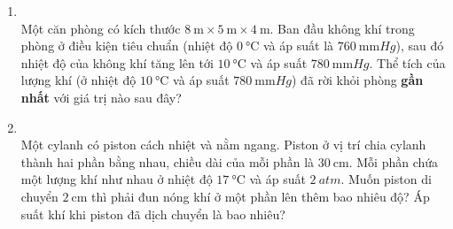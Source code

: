 \begin{enumerate}[label=\bfseries Câu \arabic*:, leftmargin=1.7cm]
\item {}\\
Một căn phòng có kích thước $\SI{8}{\meter}\times \SI{5}{\meter}\times\SI{4}{\meter}$. Ban đầu không khí trong phòng ở điều kiện tiêu chuẩn (nhiệt độ $\SI{0}{\celsius}$ và áp suất là $\SI{760}{\milli\meter Hg}$), sau đó nhiệt độ của không khí tăng lên tới $\SI{10}{\celsius}$ và áp suất $\SI{780}{\milli\meter Hg}$. Thể tích của lượng khí (ở nhiệt độ $\SI{10}{\celsius}$ và áp suất $\SI{780}{\milli\meter Hg}$) đã rời khỏi phòng \textbf{gần nhất} với giá trị nào sau đây?
\item {}\\
Một cylanh có piston cách nhiệt và nằm ngang. Piston ở vị trí chia cylanh thành hai phần bằng nhau, chiều dài của mỗi phần là $\SI{30}{\centi\meter}$. Mỗi phần chứa một lượng khí như nhau ở nhiệt độ $\SI{17}{\celsius}$ và áp suất $\SI{2}{atm}$. Muốn piston di chuyển $\SI{2}{\centi\meter}$ thì phải đun nóng khí ở một phần lên thêm bao nhiêu độ? Áp suất khí khi piston đã dịch chuyển là bao nhiêu?
\end{enumerate}
